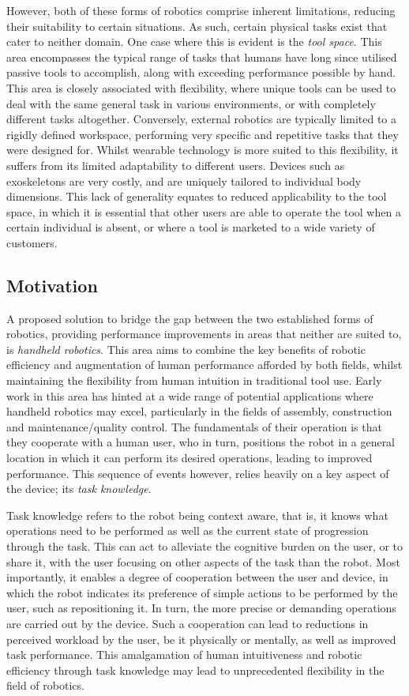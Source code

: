 \documentclass[11pt]{article}
\begin{document}
However, both of these forms of robotics comprise inherent limitations, reducing their suitability to certain situations. As such, certain physical tasks exist that cater to neither domain. One case where this is evident is the \textit{tool space}. This area encompasses the typical range of tasks that humans have long since utilised passive tools to accomplish, along with exceeding performance possible by hand. This area is closely associated with flexibility, where unique tools can be used to deal with the same general task in various environments, or with completely different tasks altogether. Conversely, external robotics are typically limited to a rigidly defined workspace, performing very specific and repetitive tasks that they were designed for. Whilst wearable technology is more suited to this flexibility, it suffers from its limited adaptability to different users. Devices such as exoskeletons are very costly, and are uniquely tailored to individual body dimensions. This lack of generality equates to reduced applicability to the tool space, in which it is essential that other users are able to operate the tool when a certain individual is absent, or where a tool is marketed to a wide variety of customers.

\subsection{Motivation}
A proposed solution to bridge the gap between the two established forms of robotics, providing performance improvements in areas that neither are suited to, is \textit{handheld robotics}. This area aims to combine the key benefits of robotic efficiency and augmentation of human performance afforded by both fields, whilst maintaining the flexibility from human intuition in traditional tool use. Early work in this area has hinted at a wide range of potential applications where handheld robotics may excel, particularly in the fields of assembly, construction and maintenance/quality control. The fundamentals of their operation is that they cooperate with a human user, who in turn, positions the robot in a general location in which it can perform its desired operations, leading to improved performance. This sequence of events however, relies heavily on a key aspect of the device; its \textit{task knowledge}. 

Task knowledge refers to the robot being context aware, that is, it knows what operations need to be performed as well as the current state of progression through the task. This can act to alleviate the cognitive burden on the user, or to share it, with the user focusing on other aspects of the task than the robot. Most importantly, it enables a degree of cooperation between the user and device, in which the robot indicates its preference of simple actions to be performed by the user, such as repositioning it. In turn, the more precise or demanding operations are carried out by the device. Such a cooperation can lead to reductions in perceived workload by the user, be it physically or mentally, as well as improved task performance. This amalgamation of human intuitiveness and robotic efficiency through task knowledge may lead to unprecedented flexibility in the field of robotics.
\end{document}
